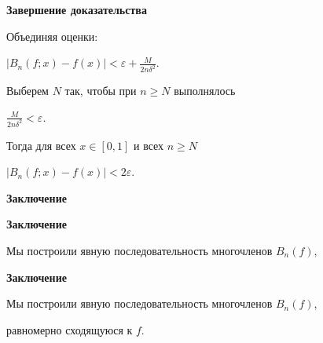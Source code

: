 \documentclass[11pt]{article}
\begin{document}
\begin{center}
{\color{notaeYELLOW}\bfseries\fontsize{44}{52}\selectfont Завершение доказательства}
\end{center}
\vspace*{\fill}
\begin{center}
\fontsize{36}{43}\selectfont
Объединяя оценки:\par\vspace{0.4in}
$\left| B_n(f;x) - f(x) \right| < \varepsilon + \frac{M}{2n\delta^2}.$\par\vspace{0.4in}
Выберем $N$ так, чтобы при $n \geqslant N$ выполнялось\par\vspace{0.4in}
$\frac{M}{2n\delta^2} < \varepsilon.$\par\vspace{0.4in}
Тогда для всех $x \in [0,1]$ и всех $n \geqslant N$\par\vspace{0.4in}
$\left| B_n(f;x) - f(x) \right| < 2\varepsilon.$\par\vspace{0.4in}
\end{center}
\vspace*{\fill}

\newpage

\begin{center}
{\color{notaeYELLOW}\bfseries\fontsize{44}{52}\selectfont Заключение}
\end{center}
\vspace*{\fill}
\begin{center}
\fontsize{36}{43}\selectfont
\end{center}
\vspace*{\fill}

\newpage

\begin{center}
{\color{notaeYELLOW}\bfseries\fontsize{44}{52}\selectfont Заключение}
\end{center}
\vspace*{\fill}
\begin{center}
\fontsize{36}{43}\selectfont
Мы построили явную последовательность многочленов $B_n(f)$,\par\vspace{0.4in}
\end{center}
\vspace*{\fill}

\newpage

\begin{center}
{\color{notaeYELLOW}\bfseries\fontsize{44}{52}\selectfont Заключение}
\end{center}
\vspace*{\fill}
\begin{center}
\fontsize{36}{43}\selectfont
Мы построили явную последовательность многочленов $B_n(f)$,\par\vspace{0.4in}
равномерно сходящуюся к $f$.\par\vspace{0.4in}
\end{center}
\vspace*{\fill}
\end{document}
